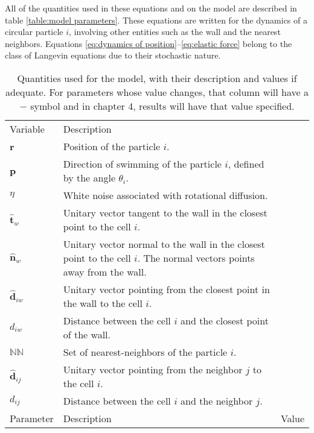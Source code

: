 All of the quantities used in these equations and on the model are described in table \ref{table:model parameters}. These equations are written for the dynamics of a circular particle $i$, involving other entities such as the wall and the nearest neighbors. Equations \eqref{eq:dynamics of position}--\eqref{eq:elastic force} belong to the class of Langevin equations due to their stochastic nature.

\begin{table}[!h]
   \centering
    \small
    \caption[Summary of the quantities used in the simulations]{Quantities used for the model, with their description and values if adequate. For parameters whose value changes, that column will have a $-$ symbol and in chapter 4, results will have that value specified. }
    \begin{tabularx}{\textwidth}{lXl}
    \hline\noalign{\smallskip}
         Variable  & Description & \quad   \\
    \noalign{\smallskip}\hline\noalign{\smallskip}
         \textbf{r} & Position of the particle $i$. & \quad \\ 
         \textbf{p} & Direction of swimming of the particle $i$, defined by the angle $\theta_i$. & \quad \\
         $\eta$ & White noise associated with rotational diffusion. & \quad \\
         $\hat{\textbf{t}}_w$ & Unitary vector tangent to the wall in the closest point to the cell $i$. & \quad \\
         $\hat{\textbf{n}}_{w}$ & Unitary vector normal to the wall in the closest point to the cell $i$. The normal vectors points away from the wall. & \quad \\
         $\hat{\textbf{d}}_{iw}$ & Unitary vector pointing from the closest point in the wall to the cell $i$. & \quad \\
         $d_{iw}$ & Distance between the cell $i$ and the closest point of the wall. & \quad \\
         $\mathbb{NN}$ & Set of nearest-neighbors of the particle $i$. & \quad \\
         $\hat{\textbf{d}}_{ij}$ & Unitary vector pointing from the neighbor $j$ to the cell $i$. & \quad \\
         $d_{ij}$ & Distance between the cell $i$ and the neighbor $j$. & \quad \\
    \hline\noalign{\smallskip}
        Parameter  & Description & Value   \\

\end{tabularx}
\end{table}
